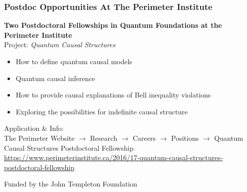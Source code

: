 \documentclass[]{beamer}
\begin{document}
\begin{frame}
    \frametitle{Postdoc Opportunities At The Perimeter Institute}
    \begin{center}
    \textbf{Two Postdoctoral Fellowships in Quantum Foundations at the Perimeter Institute} \\
    Project: \textit{Quantum Causal Structures} \\
    \vfill
    \begin{itemize}
        \item How to define quantum causal models
        \item Quantum causal inference
        \item How to provide causal explanations of Bell inequality violations
        \item Exploring the possibilities for indefinite causal structure
    \end{itemize}
    \vfill
    {\scriptsize Application \& Info:}\\

    The Perimeter Website $\to$ Research $\to$ Careers $\to$ Positions $\to$ Quantum Causal Structures Postdoctoral Fellowship
    \textcolor{blue}{\url{https://www.perimeterinstitute.ca/2016/17-quantum-causal-structures-postdoctoral-fellowship}}
    \vfill

    {\scriptsize Funded by the John Templeton Foundation}
    \end{center}

\end{frame}
\end{document}
